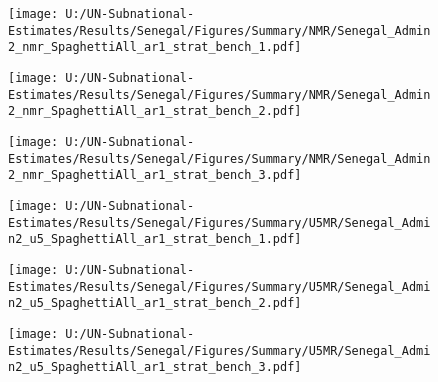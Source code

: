 \documentclass[
]{article}
\begin{document}
\begin{figure}[!h]
 \centering
\texttt{[image: U:/UN-Subnational-Estimates/Results/Senegal/Figures/Summary/NMR/Senegal\_Admin2\_nmr\_SpaghettiAll\_ar1\_strat\_bench\_1.pdf]}
\end{figure}
\begin{figure}[!h]
 \centering
\texttt{[image: U:/UN-Subnational-Estimates/Results/Senegal/Figures/Summary/NMR/Senegal\_Admin2\_nmr\_SpaghettiAll\_ar1\_strat\_bench\_2.pdf]}
\end{figure}
\begin{figure}[!h]
 \centering
\texttt{[image: U:/UN-Subnational-Estimates/Results/Senegal/Figures/Summary/NMR/Senegal\_Admin2\_nmr\_SpaghettiAll\_ar1\_strat\_bench\_3.pdf]}
\end{figure}
\clearpage
\begin{figure}[!h]
 \centering
\texttt{[image: U:/UN-Subnational-Estimates/Results/Senegal/Figures/Summary/U5MR/Senegal\_Admin2\_u5\_SpaghettiAll\_ar1\_strat\_bench\_1.pdf]}
\end{figure}
\begin{figure}[!h]
 \centering
\texttt{[image: U:/UN-Subnational-Estimates/Results/Senegal/Figures/Summary/U5MR/Senegal\_Admin2\_u5\_SpaghettiAll\_ar1\_strat\_bench\_2.pdf]}
\end{figure}
\begin{figure}[!h]
 \centering
\texttt{[image: U:/UN-Subnational-Estimates/Results/Senegal/Figures/Summary/U5MR/Senegal\_Admin2\_u5\_SpaghettiAll\_ar1\_strat\_bench\_3.pdf]}
\end{figure}
\end{document}
